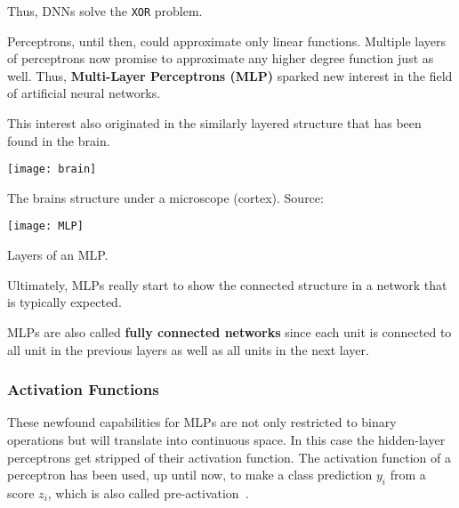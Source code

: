 Thus, DNNs solve the \lstinline|XOR| problem.


Perceptrons, until then, could approximate only linear functions.
Multiple layers of perceptrons now promise to approximate any higher degree function just as well.
Thus, \textbf{Multi-Layer Perceptrons (MLP)} sparked new interest in the field of artificial neural networks.

This interest also originated in the similarly layered structure that has been found in the brain.
\begin{marginfigure}
    \texttt{[image: brain]}
    \caption{The brains structure under a microscope (cortex). Source:\cite{NN_book}}
\end{marginfigure}
\begin{marginfigure}
    \texttt{[image: MLP]}
    \caption{Layers of an MLP.}
\end{marginfigure}
Ultimately, MLPs really start to show the connected structure in a network that is typically expected.

MLPs are also called \textbf{fully connected networks} since each unit is connected to all unit in the previous layers as well as all units in the next layer.



\subsubsection{Activation Functions}
These newfound capabilities for MLPs are not only restricted to binary operations but will translate into continuous space.
In this case the hidden-layer perceptrons get stripped of their activation function.
The activation function of a perceptron has been used, up until now, to make a class prediction $y_i$ from a score $z_i$, which is also called pre-activation~\cite[p.~6]{grosse}.

